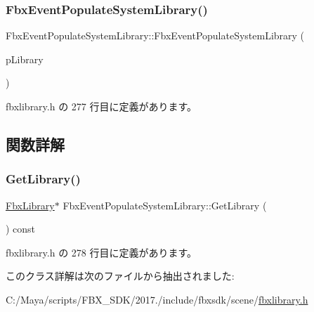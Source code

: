 \subsubsection{\texorpdfstring{Fbx\+Event\+Populate\+System\+Library()}{FbxEventPopulateSystemLibrary()}}
{\footnotesize\ttfamily Fbx\+Event\+Populate\+System\+Library\+::\+Fbx\+Event\+Populate\+System\+Library (\begin{DoxyParamCaption}\item[{\hyperlink{class_fbx_library}{Fbx\+Library} $\ast$}]{p\+Library }\end{DoxyParamCaption})\hspace{0.3cm}{\ttfamily [inline]}}



 fbxlibrary.\+h の 277 行目に定義があります。



\subsection{関数詳解}
\mbox{\label{class_fbx_event_populate_system_library_a9916adf51d1fed8a4c6aeb8f12587ce0}} 
\subsubsection{\texorpdfstring{Get\+Library()}{GetLibrary()}}
{\footnotesize\ttfamily \hyperlink{class_fbx_library}{Fbx\+Library}$\ast$ Fbx\+Event\+Populate\+System\+Library\+::\+Get\+Library (\begin{DoxyParamCaption}{ }\end{DoxyParamCaption}) const\hspace{0.3cm}{\ttfamily [inline]}}



 fbxlibrary.\+h の 278 行目に定義があります。



このクラス詳解は次のファイルから抽出されました\+:\begin{DoxyCompactItemize}
\item 
C\+:/\+Maya/scripts/\+F\+B\+X\+\_\+\+S\+D\+K/2017./include/fbxsdk/scene/\hyperlink{fbxlibrary_8h}{fbxlibrary.\+h}\end{DoxyCompactItemize}
